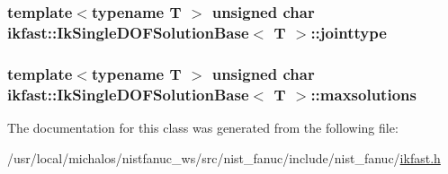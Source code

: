 \hypertarget{classikfast_1_1IkSingleDOFSolutionBase_a3c458c4a2b06b4a2ccffc265cf34c6fe}{
\subsubsection[{jointtype}]{\setlength{\rightskip}{0pt plus 5cm}template$<$typename T $>$ unsigned char {\bf ikfast\-::\-Ik\-Single\-D\-O\-F\-Solution\-Base}$<$ T $>$\-::jointtype}}\label{classikfast_1_1IkSingleDOFSolutionBase_a3c458c4a2b06b4a2ccffc265cf34c6fe}
\hypertarget{classikfast_1_1IkSingleDOFSolutionBase_a45404bf30c7b90131b7ce2b8045c6f6a}{
\subsubsection[{maxsolutions}]{\setlength{\rightskip}{0pt plus 5cm}template$<$typename T $>$ unsigned char {\bf ikfast\-::\-Ik\-Single\-D\-O\-F\-Solution\-Base}$<$ T $>$\-::maxsolutions}}\label{classikfast_1_1IkSingleDOFSolutionBase_a45404bf30c7b90131b7ce2b8045c6f6a}


The documentation for this class was generated from the following file\-:\begin{DoxyCompactItemize}
\item 
/usr/local/michalos/nistfanuc\-\_\-ws/src/nist\-\_\-fanuc/include/nist\-\_\-fanuc/\hyperlink{ikfast_8h}{ikfast.\-h}\end{DoxyCompactItemize}

